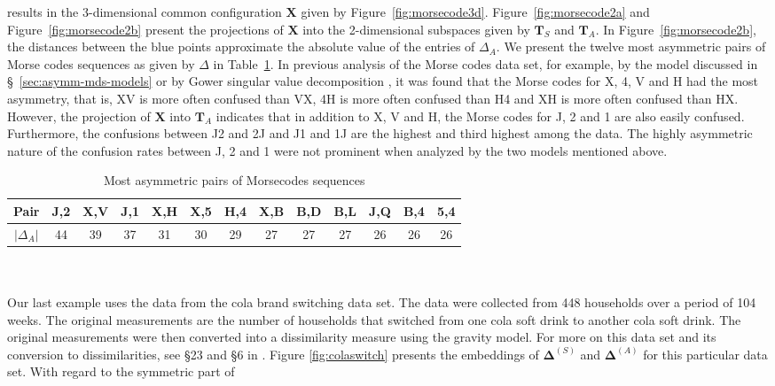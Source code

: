 results in the 3-dimensional common configuration $\mathbf{X}$ given
by Figure~\ref{fig:morsecode3d}. Figure~\ref{fig:morsecode2a} and
Figure~\ref{fig:morsecode2b} present the projections of $\mathbf{X}$
into the 2-dimensional subspaces given by $\mathbf{T}_S$ and
$\mathbf{T}_A$. In Figure~\ref{fig:morsecode2b}, the distances between
the blue points approximate the absolute value of the entries of
$\Delta_A$.
%
%
We present the twelve most asymmetric pairs of Morse codes sequences
as given by $\Delta$ in Table~\ref{tab:morsecode}. In previous
analysis of the Morse codes data set, for example, by the model
discussed in \S~\ref{sec:asymm-mds-models} or by Gower singular value
decomposition \citep{gower77:_recen}, it was found that the Morse
codes for X, 4, V and H had the most asymmetry, that is, XV is more
often confused than VX, 4H is more often confused than H4 and XH is
more often confused than HX. However, the projection of $\mathbf{X}$
into $\mathbf{T}_A$ indicates that in addition to X, V and H, the
Morse codes for J, 2 and 1 are also easily confused. Furthermore, the
confusions between J2 and 2J and J1 and 1J are the highest and third
highest among the data. The highly asymmetric nature of the confusion
rates between J, 2 and 1 were not prominent when analyzed by the two
models mentioned above.
\begin{table}
\begin{tabular}[h]{|c|c|c|c|c|c|c|c|c|c|c|c|c|}
  \hline
  Pair & J,2 & X,V & J,1 & X,H & X,5 & H,4 & X,B & B,D & B,L & J,Q &
  B,4 & 5,4 \\ \hline
  $|\Delta_A|$ & 44 & 39 & 37 & 31 & 30 & 29 & 27 & 27 & 27 &  26
  & 26 & 26 \\ \hline
\end{tabular}
\caption{Most asymmetric pairs of Morsecodes sequences}
\label{tab:morsecode}
\end{table}
\\ \\
\noindent
Our last example uses the data from the cola brand switching data
set. The data were collected from 448 households over a period of 104
weeks. The original measurements are the number of households that
switched from one cola soft drink to another cola soft drink. The
original measurements were then converted into a dissimilarity measure
using the gravity model. For more on this data set and its conversion
to dissimilarities, see \S 23 and \S 6 in
\citet{borg05:_moder}. Figure \ref{fig:colaswitch} presents the
embeddings of $\bm{\Delta}^{(S)}$ and $\bm{\Delta}^{(A)}$ for this
particular data set. With regard to the symmetric part of

